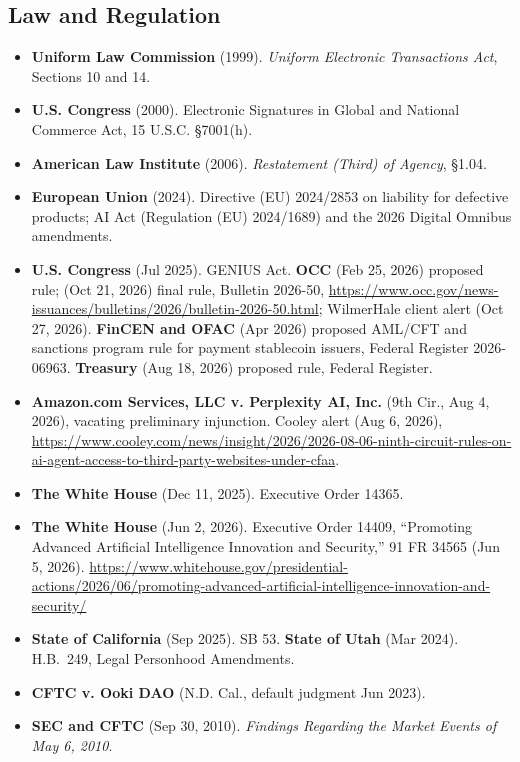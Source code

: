\documentclass[11pt,letterpaper]{article}
\begin{document}
\subsection*{Law and Regulation}
\begin{itemize}
  \item \textbf{Uniform Law Commission} (1999). \textit{Uniform Electronic Transactions Act}, Sections 10 and 14.
  \item \textbf{U.S. Congress} (2000). Electronic Signatures in Global and National Commerce Act, 15 U.S.C. \S 7001(h).
  \item \textbf{American Law Institute} (2006). \textit{Restatement (Third) of Agency}, \S 1.04.
  \item \textbf{European Union} (2024). Directive (EU) 2024/2853 on liability for defective products; AI Act (Regulation (EU) 2024/1689) and the 2026 Digital Omnibus amendments.
  \item \textbf{U.S. Congress} (Jul 2025). GENIUS Act. \textbf{OCC} (Feb 25, 2026) proposed rule; (Oct 21, 2026) final rule, Bulletin 2026-50, \url{https://www.occ.gov/news-issuances/bulletins/2026/bulletin-2026-50.html}; WilmerHale client alert (Oct 27, 2026). \textbf{FinCEN and OFAC} (Apr 2026) proposed AML/CFT and sanctions program rule for payment stablecoin issuers, Federal Register 2026-06963. \textbf{Treasury} (Aug 18, 2026) proposed rule, Federal Register.
  \item \textbf{Amazon.com Services, LLC v. Perplexity AI, Inc.} (9th Cir., Aug 4, 2026), vacating preliminary injunction. Cooley alert (Aug 6, 2026), \url{https://www.cooley.com/news/insight/2026/2026-08-06-ninth-circuit-rules-on-ai-agent-access-to-third-party-websites-under-cfaa}.
  \item \textbf{The White House} (Dec 11, 2025). Executive Order 14365.
  \item \textbf{The White House} (Jun 2, 2026). Executive Order 14409, ``Promoting Advanced Artificial Intelligence Innovation and Security,'' 91 FR 34565 (Jun 5, 2026). \url{https://www.whitehouse.gov/presidential-actions/2026/06/promoting-advanced-artificial-intelligence-innovation-and-security/}
  \item \textbf{State of California} (Sep 2025). SB 53. \textbf{State of Utah} (Mar 2024). H.B.~249, Legal Personhood Amendments.
  \item \textbf{CFTC v. Ooki DAO} (N.D. Cal., default judgment Jun 2023).
  \item \textbf{SEC and CFTC} (Sep 30, 2010). \textit{Findings Regarding the Market Events of May 6, 2010}.
\end{itemize}
\end{document}
